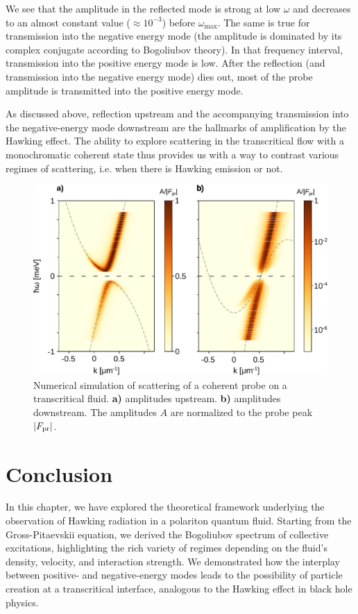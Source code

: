 We see that the amplitude in the reflected mode is strong at low $\omega$ and decreases to an almost constant value ($\approx 10^{-3}$) before $\omega_\mathrm{max}$.
The same is true for transmission into the negative energy mode (the amplitude is dominated by its complex conjugate according to Bogoliubov theory).
In that frequency interval, transmission into the positive energy mode is low.
After the reflection (and transmission into the negative energy mode) dies out, most of the probe amplitude is transmitted into the positive energy mode.

As discussed above, reflection upstream and the accompanying transmission into the negative-energy mode downstream are the hallmarks of amplification by the Hawking effect.
The ability to explore scattering in the transcritical flow with a monochromatic coherent state thus provides us with a way to contrast various regimes of scattering, i.e. when there is Hawking emission or not.

\begin{figure}
    \centering
    \includegraphics[width=0.75\linewidth]{chap_AG_theory/fig/fignumerics.pdf}
    \caption{Numerical simulation of scattering of a coherent probe on a transcritical fluid. \textbf{a)} amplitudes upstream. \textbf{b)} amplitudes downstream. The amplitudes $A$ are normalized to the probe peak $\abs{F_\mathrm{pr}}$.}
    \label{fig:fignumerics}
\end{figure}




\section{Conclusion}

In this chapter, we have explored the theoretical framework underlying the observation of Hawking radiation in a polariton quantum fluid. Starting from the Gross-Pitaevskii equation, we derived the Bogoliubov spectrum of collective excitations, highlighting the rich variety of regimes depending on the fluid's density, velocity, and interaction strength. We demonstrated how the interplay between positive- and negative-energy modes leads to the possibility of particle creation at a transcritical interface, analogous to the Hawking effect in black hole physics.


